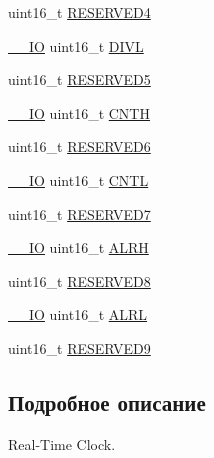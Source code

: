 \begin{DoxyCompactItemize}
\item 
uint16\+\_\+t \mbox{\hyperlink{struct_r_t_c___type_def_ae77864629c9ae9768a752e045c44833d}{R\+E\+S\+E\+R\+V\+E\+D4}}
\item 
\mbox{\hyperlink{group___c_m_s_i_s___c_m3__core__definitions_gaec43007d9998a0a0e01faede4133d6be}{\+\_\+\+\_\+\+IO}} uint16\+\_\+t \mbox{\hyperlink{struct_r_t_c___type_def_ad0c75a7cc4e925da0faedcd8860cb43a}{D\+I\+VL}}
\item 
uint16\+\_\+t \mbox{\hyperlink{struct_r_t_c___type_def_a052c02494c2dde3f74ff7d8987ee5230}{R\+E\+S\+E\+R\+V\+E\+D5}}
\item 
\mbox{\hyperlink{group___c_m_s_i_s___c_m3__core__definitions_gaec43007d9998a0a0e01faede4133d6be}{\+\_\+\+\_\+\+IO}} uint16\+\_\+t \mbox{\hyperlink{struct_r_t_c___type_def_a094741bcc8fca018b500f7468531f0ef}{C\+N\+TH}}
\item 
uint16\+\_\+t \mbox{\hyperlink{struct_r_t_c___type_def_a74bdff4226786261b4c18b63dd21e3bd}{R\+E\+S\+E\+R\+V\+E\+D6}}
\item 
\mbox{\hyperlink{group___c_m_s_i_s___c_m3__core__definitions_gaec43007d9998a0a0e01faede4133d6be}{\+\_\+\+\_\+\+IO}} uint16\+\_\+t \mbox{\hyperlink{struct_r_t_c___type_def_a212cb62d18ce312bc3f69641aa76688d}{C\+N\+TL}}
\item 
uint16\+\_\+t \mbox{\hyperlink{struct_r_t_c___type_def_abb8597ac192c0d24ab6b13b031a34d37}{R\+E\+S\+E\+R\+V\+E\+D7}}
\item 
\mbox{\hyperlink{group___c_m_s_i_s___c_m3__core__definitions_gaec43007d9998a0a0e01faede4133d6be}{\+\_\+\+\_\+\+IO}} uint16\+\_\+t \mbox{\hyperlink{struct_r_t_c___type_def_a873ee28923e732677a3a58971bdc9e6b}{A\+L\+RH}}
\item 
uint16\+\_\+t \mbox{\hyperlink{struct_r_t_c___type_def_a5b09d77c801dc948581ef113d8a352c9}{R\+E\+S\+E\+R\+V\+E\+D8}}
\item 
\mbox{\hyperlink{group___c_m_s_i_s___c_m3__core__definitions_gaec43007d9998a0a0e01faede4133d6be}{\+\_\+\+\_\+\+IO}} uint16\+\_\+t \mbox{\hyperlink{struct_r_t_c___type_def_afea5d3abb40323a5385cf461094c06d3}{A\+L\+RL}}
\item 
uint16\+\_\+t \mbox{\hyperlink{struct_r_t_c___type_def_a3f83ce9cfda0c0e7f854ab65347058b1}{R\+E\+S\+E\+R\+V\+E\+D9}}
\end{DoxyCompactItemize}


\subsection{Подробное описание}
Real-\/\+Time Clock. 

